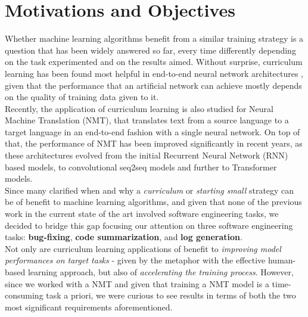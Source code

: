 \section{Motivations and Objectives}
\label{chapter:MAO}
Whether machine learning algorithms benefit from a similar training strategy is a question that has been widely answered so far, 
every time differently depending on the task experimented and on the results aimed. Without surprise, curriculum learning 
has been found most helpful in end-to-end neural network architectures \cite{bengio2009curriculum},
given that the performance that an artificial network can achieve mostly depends on the quality of training data given to it.\\
Recently, the application of curriculum learning is also studied for Neural Machine Translation (NMT), that translates text from a source
language to a target language in an end-to-end fashion with a single neural network. On top of that, the performance of 
NMT has been improved significantly in recent years, as these architectures evolved from the initial Recurrent Neural Network (RNN) based models, to convolutional
seq2seq models and further to Transformer models. \\
\newline
Since many clarified when and why a \textit{curriculum} or \textit{starting small} strategy can be of benefit
to machine learning algorithms, and given that none of the previous work in the current state of the art 
involved software engineering tasks, we decided to bridge this gap focusing our attention on three software engineering tasks: \textbf{bug-fixing}, 
\textbf{code summarization}, and \textbf{log generation}.\\
\newline
Not only are curriculum learning applications of benefit to \textit{improving model performances
on target tasks} - given by the metaphor with 
the effective human-based learning approach, but also of \textit{accelerating the training process}.
However, since we worked with a NMT and given that training a NMT model is a time-consuming task a priori, 
we were curious to see results in terms of both the two most significant requirements 
aforementioned. 


